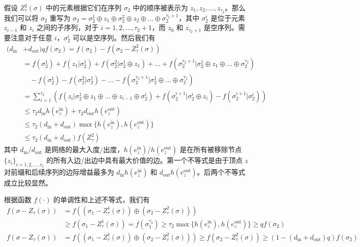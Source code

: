 假设 $Z^2_\tau(\sigma)$ 中的元素根据它们在序列 $\sigma_2$ 中的顺序被表示为 $z_1,z_2,...,z_{\tau_2}$。那么我们可以将 $\sigma_2$ 重写为 $\sigma_2=\sigma_2^1\oplus z_1 \oplus \sigma_2^2 \oplus z_2 \oplus ... \oplus \sigma_2^{\tau_2+1}$，其中 $\sigma_2^i$ 是位于元素 $z_{i-1}$ 和 $z_i$ 之间的子序列，对于 $i=1,2,...,\tau_2+1$，而 $z_0$ 和 $z_{\tau_2+1}$ 是空序列。需要注意对于任意 $i$，$\sigma_2^i$ 可以是空序列。然后我们有
\begin{align}
(d_{\text{in}} & + d_{\text{out}}) q f(\sigma_2) = f(\sigma_2) - f(\sigma_2-Z_\tau^2(\sigma)) \\
& = f(\sigma_2^1) + f(z_1|\sigma_2^1)+f(\sigma_2^2| \sigma_2^1\oplus z_1) + ... + f(\sigma_2^{\tau_2+1}| \sigma_2^1\oplus z_1 \oplus ... \oplus \sigma_2^{\tau_2})\\
& \quad - f(\sigma_2^1) -f(\sigma_2^2|\sigma_2^1) - ... - f(\sigma_2^{\tau_2+1}| \sigma_2^1\oplus ... \oplus \sigma_2^{\tau_2}) \\
& = \sum_{i=1}^{\tau_2} \left( f(z_i|\sigma_2^1\oplus z_1 \oplus ... \oplus z_{i-1}\oplus \sigma_2^i)+f(\sigma_2^{i+1}|\sigma_2^i\oplus z_i) - f(\sigma_2^{i+1}|\sigma_2^i) \right)\\
& \le \tau_2 d_{\text{in}} h(e_z^{\text{in}}) + \tau_2 d_{\text{out}} h(e_z^{\text{out}}) \\
& \le \tau_2(d_{\text{in}} + d_{\text{out}}) \max \{h(e_z^{\text{in}}),h(e_z^{\text{out}})\} \\
& \le \tau_2(d_{\text{in}} + d_{\text{out}}) f(Z_\tau^2)
\end{align}
\noindent 其中 $d_{\text{in}}$/$d_{\text{out}}$ 是网络的最大入度/出度，$h(e_z^{\text{in}})$/$h(e_z^{\text{out}})$ 是在所有被移除节点 $\{z_i\}_{i=1,2,...,\tau_2}$ 的所有入边/出边中具有最大价值的边。第一个不等式是由于顶点 $z$ 对前缀和后续序列的边际增益最多为 $d_{\text{in}} h(e_z^{\text{in}})$ 和 $d_{\text{out}} h(e_z^{\text{out}})$。后两个不等式成立比较显然。

根据函数 $f(\cdot)$ 的单调性和上述不等式，我们有
\begin{align}
f(\sigma- Z_\tau(\sigma)) & = f((\sigma_1 - Z_\tau^1(\sigma)) \oplus (\sigma_2 - Z_\tau^2(\sigma))) \\ &\ge f(\sigma_1 - Z_\tau^1(\sigma)) = f(\sigma_1^{\tau_2}) \ge \tau_2 \max \{h(e_z^{\text{in}}),h(e_z^{\text{out}})\} \ge q f(\sigma_2) \\
f(\sigma-Z_\tau(\sigma)) & = f((\sigma_1 - Z_\tau^1(\sigma)) \oplus (\sigma_2 - Z_\tau^2(\sigma))) \ge f(\sigma_2 -Z_\tau^2(\sigma)) \ge (1-(d_{\text{in}} + d_{\text{out}})q) f(\sigma_2)
\end{align}

